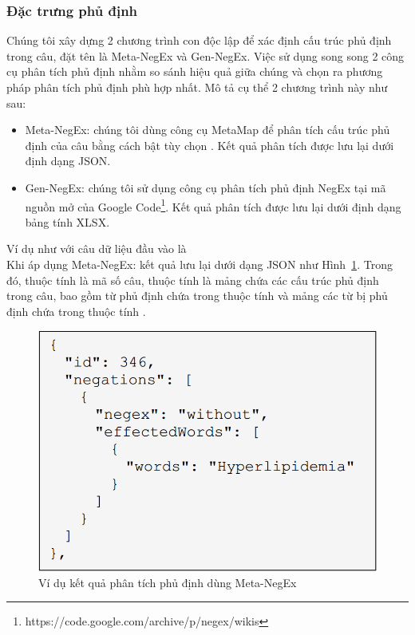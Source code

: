 \subsubsection*{Đặc trưng phủ định}
Chúng tôi xây dựng 2 chương trình con độc lập để xác định cấu trúc phủ định trong câu, đặt tên là Meta-NegEx và Gen-NegEx. Việc sử dụng song song 2 công cụ phân tích phủ định nhằm so sánh hiệu quả giữa chúng và chọn ra phương pháp phân tích phủ định phù hợp nhất. Mô tả cụ thể 2 chương trình này như sau:
\begin{itemize}
\item Meta-NegEx: chúng tôi dùng công cụ MetaMap để phân tích cấu trúc phủ định của câu bằng cách bật tùy chọn . Kết quả phân tích được lưu lại dưới định dạng JSON.

\item Gen-NegEx: chúng tôi sử dụng công cụ phân tích phủ định NegEx tại mã nguồn mở của Google Code\footnote{https://code.google.com/archive/p/negex/wikis}. Kết quả phân tích được lưu lại dưới định dạng bảng tính XLSX. 
\end{itemize}

Ví dụ như với câu dữ liệu đầu vào là \\

Khi áp dụng Meta-NegEx: kết quả lưu lại dưới dạng JSON như Hình~\ref{fig:Meta-NegEx}. Trong đó, thuộc tính  là mã số câu, thuộc tính  là mảng chứa các cấu trúc phủ định trong câu, bao gồm từ phủ định chứa trong thuộc tính  và mảng các từ bị phủ định chứa trong thuộc tính .\\

\begin{figure}[H]
\centering
\includegraphics[scale=0.35]{../hinh/JSON.png}
\caption{Ví dụ kết quả phân tích phủ định dùng Meta-NegEx}
\label{fig:Meta-NegEx}
\end{figure}

